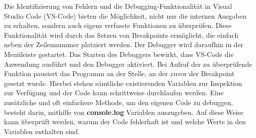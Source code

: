 Die Identifizierung von Fehlern und die Debugging-Funktionalität in Visual Studio Code (VS-Code) bieten die Möglichkeit, nicht nur die internen Ausgaben zu erhalten, sondern auch eigens verfasste Funktionen zu überprüfen. Diese Funktionalität wird durch das Setzen von Breakpoints ermöglicht, die einfach neben der Zeilennummer platziert werden. Der Debugger wird daraufhin in der Menüleiste gestartet. Das Starten des Debuggers bewirkt, dass VS-Code die Anwendung ausführt und den Debugger aktiviert. Bei Aufruf der zu überprüfende Funktion pausiert das Programm an der Stelle, an der zuvor der Breakpoint gesetzt wurde. Hierbei stehen sämtliche existierenden Variablen zur Inspektion zur Verfügung und der Code kann schrittweise durchlaufen werden.
\newline
Eine zusätzliche und oft einfachere Methode, um den eigenen Code zu debuggen, besteht darin, mithilfe von \textbf{console.log} Variablen auszugeben. Auf diese Weise kann überprüft werden, warum der Code fehlerhaft ist und welche Werte in den Variablen enthalten sind.
\cite{express_js_debugging}